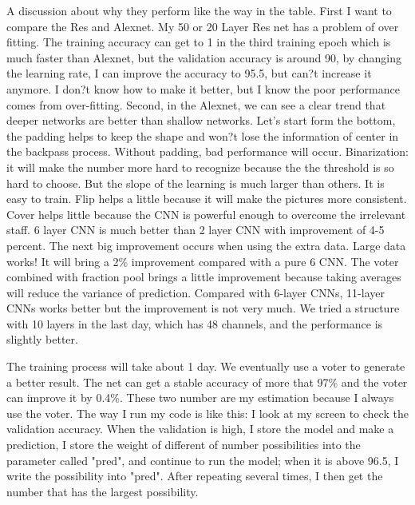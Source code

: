 \documentclass[twocolumn]{webofc}
\begin{document}
A discussion about why they perform like the way in the table. 
First I want to compare the Res and Alexnet. My 50 or 20 Layer Res net has a problem of over fitting. The training accuracy can get to 1 in the third training epoch which is much faster than Alexnet, but the validation accuracy is around 90, by changing the learning rate, I can improve the accuracy to 95.5, but can?t increase it anymore. I don?t know how to make it better, but I know the poor performance comes from over-fitting. 
Second, in the Alexnet, we can see a clear trend that deeper networks are better than shallow networks. 
Let's start form the bottom, the padding helps to keep the shape and won?t lose the information of center in the backpass process. Without padding, bad performance will occur. 
Binarization: it will make the number more hard to recognize because the the threshold is so hard to choose. But the slope of the learning is much larger than others. It is easy to train.
Flip helps a little because it will make the pictures more consistent. 
Cover helps little because the CNN is powerful enough to overcome the irrelevant staff.
6 layer CNN is much better than 2 layer CNN with improvement of 4-5 percent. The next big improvement occurs when using the extra data.
Large data works! It will bring a 2\% improvement compared with a pure 6 CNN. 
The voter combined with fraction pool brings a little improvement because taking averages will reduce the variance of prediction. 
Compared with 6-layer CNNs, 11-layer CNNs works better but the improvement is not very much. We tried a structure with 10 layers in the last day, which has 48 channels, and the performance is slightly better. 







The training process will take about 1 day. We eventually use a voter to generate a better result. The net can get a stable accuracy of more that 97\% and the voter can improve it by 0.4\%. These two number are my estimation because I always use the voter. The way I run my code is like this: I look at my screen to check the validation accuracy. When the validation is high, I store the model and make a prediction, I store the weight of different of number possibilities into the parameter called "pred", and continue to run the model; when it is above 96.5, I write the possibility into "pred". After repeating several times, I then get the number that has the largest possibility.
\end{document}

